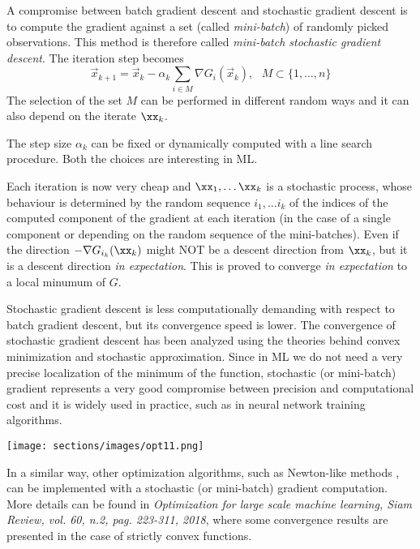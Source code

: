 A compromise between batch gradient descent and stochastic gradient descent is to compute the gradient against a set (called \textit{mini-batch}) of randomly picked observations. This method is therefore called \textit{mini-batch stochastic gradient descent}. The iteration step becomes
$$ \vec{x}_{k+1} = \vec{x}_k - \alpha_k\sum_{i \in M}{\nabla{G_i}(\vec{x}_k)},\ \ \ M \subset \{1, \hdots, n\} $$
The selection of the set $M$ can be performed in different random ways and it can also depend on the iterate $\xx_k$.

The step size $\alpha_k$ can be fixed or dynamically computed with a line search procedure. Both the choices are interesting in ML.

Each iteration is now very cheap and $\xx_1, \ldots \xx_k $ is a stochastic process, whose behaviour is determined by the random sequence $i_1, \ldots i_k$ of the indices of the computed component of the gradient at each iteration (in the case of a single component or depending on the random sequence of the mini-batches).
Even if the direction $-\nabla G_{i_k}(\xx_k)$ might NOT be a descent direction from $\xx_k$, but it is a descent direction \textit{in expectation}. This is proved to converge \textit{in expectation} to a local minumum of $G$.

Stochastic gradient descent is less computationally demanding with respect to batch gradient descent, but its convergence speed is lower. The convergence of stochastic gradient descent has been analyzed using the theories behind convex minimization and stochastic approximation.
Since in ML we do not need a very precise localization of the minimum of the function, stochastic (or mini-batch) gradient represents a very good compromise between precision and computational cost and it is widely used in practice, such as in neural network training algorithms.

\texttt{[image: sections/images/opt11.png]}

In a similar way, other optimization algorithms, such as Newton-like methods , can be implemented with a stochastic (or mini-batch)  gradient computation.
More details can be found  in \textit{Optimization for large scale machine learning, Siam Review, vol. 60, n.2, pag. 223-311, 2018}, where some convergence results are presented in the case of strictly convex functions.

